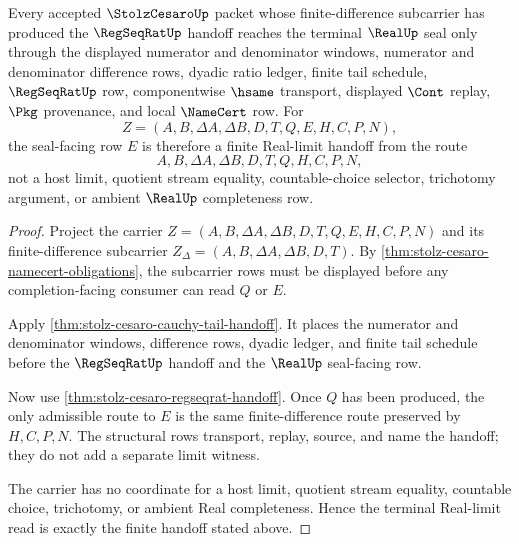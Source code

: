 \begin{theorem}
\label{thm:stolz-cesaro-real-limit-handoff}
Every accepted $\StolzCesaroUp$ packet whose finite-difference subcarrier has produced the $\RegSeqRatUp$ handoff reaches the terminal $\RealUp$ seal only through the displayed numerator and denominator windows, numerator and denominator difference rows, dyadic ratio ledger, finite tail schedule, $\RegSeqRatUp$ row, componentwise $\hsame$ transport, displayed $\Cont$ replay, $\Pkg$ provenance, and local $\NameCert$ row. For
$$
Z=(A,B,\Delta A,\Delta B,D,T,Q,E,H,C,P,N),
$$
the seal-facing row $E$ is therefore a finite Real-limit handoff from the route
$$
A,B,\Delta A,\Delta B,D,T,Q,H,C,P,N,
$$
not a host limit, quotient stream equality, countable-choice selector, trichotomy argument, or ambient $\RealUp$ completeness row.
\end{theorem}
\begin{proof}
Project the carrier $Z=(A,B,\Delta A,\Delta B,D,T,Q,E,H,C,P,N)$ and its finite-difference subcarrier $Z_{\Delta}=(A,B,\Delta A,\Delta B,D,T)$. By \autoref{thm:stolz-cesaro-namecert-obligations}, the subcarrier rows must be displayed before any completion-facing consumer can read $Q$ or $E$.

Apply \autoref{thm:stolz-cesaro-cauchy-tail-handoff}. It places the numerator and denominator windows, difference rows, dyadic ledger, and finite tail schedule before the $\RegSeqRatUp$ handoff and the $\RealUp$ seal-facing row.

Now use \autoref{thm:stolz-cesaro-regseqrat-handoff}. Once $Q$ has been produced, the only admissible route to $E$ is the same finite-difference route preserved by $H,C,P,N$. The structural rows transport, replay, source, and name the handoff; they do not add a separate limit witness.

The carrier has no coordinate for a host limit, quotient stream equality, countable choice, trichotomy, or ambient Real completeness. Hence the terminal Real-limit read is exactly the finite handoff stated above.
\end{proof}



